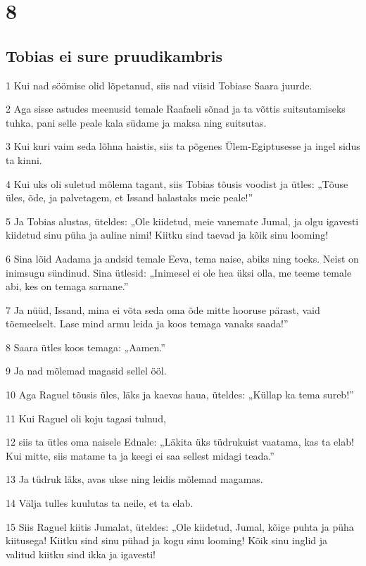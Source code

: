 \chapter{8}

\section*{Tobias ei sure pruudikambris}

\par 1 Kui nad söömise olid lõpetanud, siis nad viisid Tobiase Saara  juurde.
\par 2 Aga sisse astudes meenusid temale Raafaeli sõnad ja ta võttis  suitsutamiseks tuhka, pani selle peale kala südame ja maksa ning  suitsutas.
\par 3 Kui kuri vaim seda lõhna haistis, siis ta põgenes  Ülem-Egiptusesse ja ingel sidus ta kinni.
\par 4 Kui uks oli suletud mõlema tagant, siis Tobias tõusis voodist  ja ütles: „Tõuse üles, õde, ja palvetagem, et Issand halastaks meie  peale!”
\par 5 Ja Tobias alustas, üteldes: „Ole kiidetud, meie vanemate Jumal,  ja olgu igavesti kiidetud sinu püha ja auline nimi! Kiitku sind taevad  ja kõik sinu looming!
\par 6 Sina lõid Aadama ja andsid temale Eeva, tema naise, abiks ning  toeks. Neist on inimsugu sündinud. Sina ütlesid: „Inimesel ei ole hea  üksi olla, me teeme temale abi, kes on temaga sarnane.”
\par 7 Ja nüüd, Issand, mina ei võta seda oma õde mitte hooruse pärast,  vaid tõemeelselt. Lase mind armu leida ja koos temaga vanaks saada!”
\par 8 Saara ütles koos temaga: „Aamen.”
\par 9 Ja nad mõlemad magasid sellel ööl.
\par 10 Aga Raguel tõusis üles, läks ja kaevas haua, üteldes: „Küllap ka  tema sureb!”
\par 11 Kui Raguel oli koju tagasi tulnud,
\par 12 siis ta ütles oma naisele Ednale: „Läkita üks tüdrukuist  vaatama, kas ta elab! Kui mitte, siis matame ta ja keegi ei saa  sellest midagi teada.”
\par 13 Ja tüdruk läks, avas ukse ning leidis mõlemad magamas.
\par 14 Välja tulles kuulutas ta neile, et ta elab.
\par 15 Siis Raguel kiitis Jumalat, üteldes: „Ole kiidetud, Jumal,  kõige puhta ja püha kiitusega! Kiitku sind sinu pühad ja kogu sinu  looming! Kõik sinu inglid ja valitud kiitku sind ikka ja igavesti!

